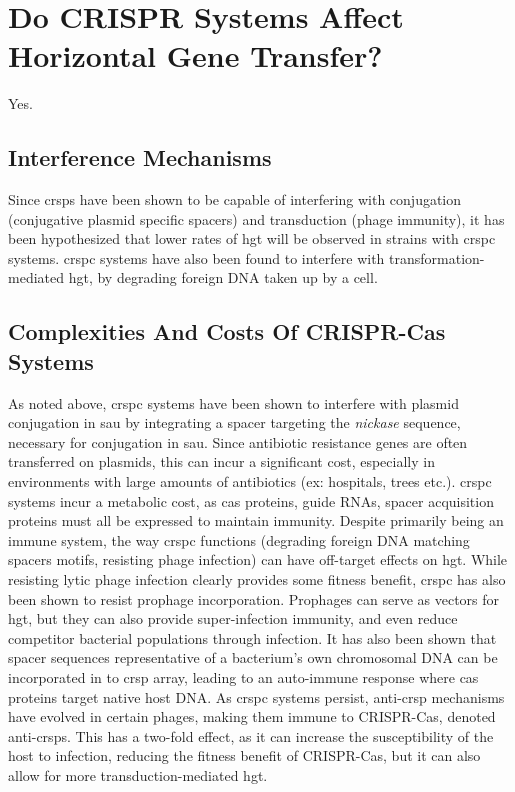 \documentclass[12pt,letter]{article}
\begin{document}
\section*{Do CRISPR Systems Affect Horizontal Gene Transfer?}
Yes.
\subsection*{Interference Mechanisms}
Since \ac{crsp}s have been shown to be capable of interfering with conjugation (conjugative plasmid specific spacers) and transduction (phage immunity), it has been hypothesized that lower rates of \ac{hgt} will be observed in strains with \ac{crspc} systems\citep{staphlim}.
\ac{crspc} systems have also been found to interfere with transformation-mediated \ac{hgt}, by degrading foreign DNA taken up by a cell\citep{climtrans}.
\subsection*{Complexities And Costs Of CRISPR-Cas Systems}
As noted above, \ac{crspc} systems have been shown to interfere with plasmid conjugation in \ac{sau} by integrating a spacer targeting the \textit{nickase} sequence, necessary for conjugation in \ac{sau}\citep{staphlim}.
Since antibiotic resistance genes are often transferred on plasmids, this can incur a significant cost, especially in environments with large amounts of antibiotics (ex: hospitals, trees etc.)\citep{hospital}.
\ac{crspc} systems incur a metabolic cost, as \ac{cas} proteins, guide RNAs, spacer acquisition proteins must all be expressed to maintain immunity\citep{crispgen}.
Despite primarily being an immune system, the way \ac{crspc} functions (degrading foreign DNA matching spacers motifs, resisting phage infection) can have off-target effects on \ac{hgt}\citep{acqorres}.
While resisting lytic phage infection clearly provides some fitness benefit, \ac{crspc} has also been shown to resist prophage incorporation\citep{acqorres}.
Prophages can serve as vectors for \ac{hgt}, but they can also provide super-infection immunity, and even reduce competitor bacterial populations through infection\citep{acqorres,transhgt}.
It has also been shown that spacer sequences representative of a bacterium's own chromosomal DNA can be incorporated in to \ac{crsp} array, leading to an auto-immune response where \ac{cas} proteins target native host DNA\citep{selfcrisp}.
As \ac{crspc} systems persist, anti-\ac{crsp} mechanisms have evolved in certain phages, making them immune to CRISPR-Cas, denoted anti-\ac{crsp}s\citep{acqorres}.
This has a two-fold effect, as it can increase the susceptibility of the host to infection, reducing the fitness benefit of CRISPR-Cas, but it can also allow for more transduction-mediated \ac{hgt}\citep{acqorres}.
\end{document}
